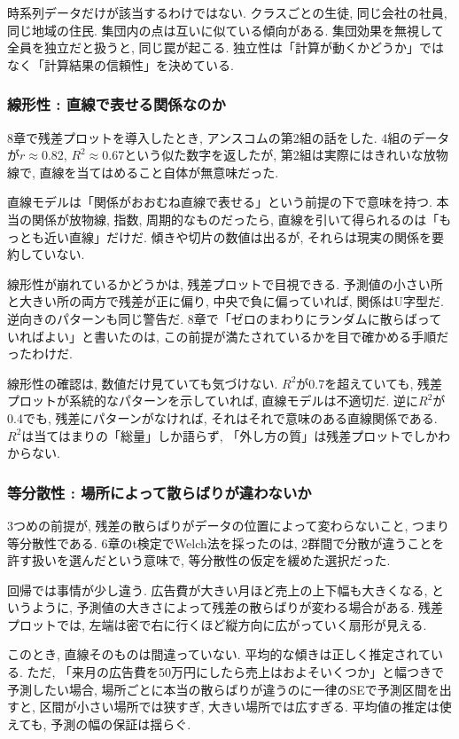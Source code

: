 時系列データだけが該当するわけではない.
クラスごとの生徒, 同じ会社の社員, 同じ地域の住民. 集団内の点は互いに似ている傾向がある.
集団効果を無視して全員を独立だと扱うと, 同じ罠が起こる.
独立性は「計算が動くかどうか」ではなく「計算結果の信頼性」を決めている.

\subsubsection*{線形性 : 直線で表せる関係なのか}

8章で残差プロットを導入したとき, アンスコムの第2組の話をした.
4組のデータが$r \approx 0.82$, $R^2 \approx 0.67$という似た数字を返したが, 第2組は実際にはきれいな放物線で, 直線を当てはめること自体が無意味だった.

直線モデルは「関係がおおむね直線で表せる」という前提の下で意味を持つ.
本当の関係が放物線, 指数, 周期的なものだったら, 直線を引いて得られるのは「もっとも近い直線」だけだ.
傾きや切片の数値は出るが, それらは現実の関係を要約していない.

線形性が崩れているかどうかは, 残差プロットで目視できる.
予測値の小さい所と大きい所の両方で残差が正に偏り, 中央で負に偏っていれば, 関係はU字型だ.
逆向きのパターンも同じ警告だ.
8章で「ゼロのまわりにランダムに散らばっていればよい」と書いたのは, この前提が満たされているかを目で確かめる手順だったわけだ.

線形性の確認は, 数値だけ見ていても気づけない.
$R^2$が0.7を超えていても, 残差プロットが系統的なパターンを示していれば, 直線モデルは不適切だ.
逆に$R^2$が0.4でも, 残差にパターンがなければ, それはそれで意味のある直線関係である.
$R^2$は当てはまりの「総量」しか語らず, 「外し方の質」は残差プロットでしかわからない.

\subsubsection*{等分散性 : 場所によって散らばりが違わないか}

3つめの前提が, 残差の散らばりがデータの位置によって変わらないこと, つまり等分散性である.
6章のt検定でWelch法を採ったのは, 2群間で分散が違うことを許す扱いを選んだという意味で, 等分散性の仮定を緩めた選択だった.

回帰では事情が少し違う.
広告費が大きい月ほど売上の上下幅も大きくなる, というように, 予測値の大きさによって残差の散らばりが変わる場合がある.
残差プロットでは, 左端は密で右に行くほど縦方向に広がっていく扇形が見える.

このとき, 直線そのものは間違っていない.
平均的な傾きは正しく推定されている.
ただ, 「来月の広告費を50万円にしたら売上はおよそいくつか」と幅つきで予測したい場合, 場所ごとに本当の散らばりが違うのに一律のSEで予測区間を出すと, 区間が小さい場所では狭すぎ, 大きい場所では広すぎる.
平均値の推定は使えても, 予測の幅の保証は揺らぐ.

